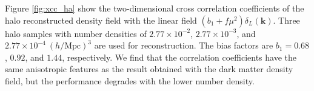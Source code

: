 \documentclass[aps,prx,twocolumn,superscriptaddress,groupedaddress,nofootinbib,amsfont]{revtex4}  %
\newcommand{\mr}{\mathrm}
\newcommand{\bmk}{\bm{k}}
\begin{document}
Figure \ref{fig:xcc_ha} show the two-dimensional cross correlation coefficients 
of the halo reconstructed density field with the linear field $(b_1+f\mu^2)\delta_L(\bmk)$.
Three halo samples with number densities of $2.77\times10^{-2}$, $2.77\times10^{-3}$, and $2.77\times10^{-4}\ (h/\mr{Mpc})^3$ are used for reconstruction.
The bias factors are $b_1=0.68$, $0.92$, and $1.44$, respectively.
We find that the correlation coefficients have the same anisotropic features 
as the result obtained with the dark matter density field, but the performance 
degrades with the lower number density.



\end{document}

